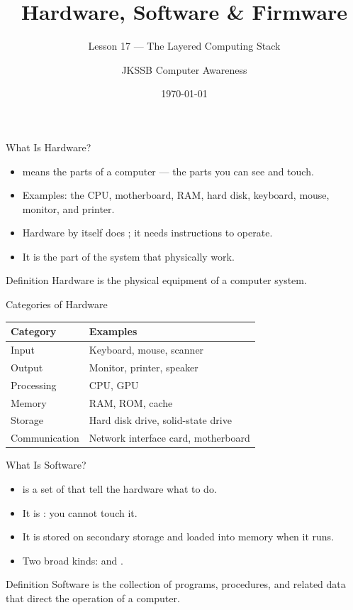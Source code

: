 \documentclass[aspectratio=169]{beamer}
\title{Hardware, Software \& Firmware}
\subtitle{Lesson 17 --- The Layered Computing Stack}
\author{JKSSB Computer Awareness}
\date{\today}
\begin{document}
\frame{\titlepage}

\begin{frame}{What Is Hardware?}
  \begin{itemize}
    \item {} means the  parts of a
      computer --- the parts you can see and touch.
    \item Examples: the CPU, motherboard, RAM, hard disk, keyboard, mouse,
      monitor, and printer.
    \item Hardware by itself does ; it needs
      instructions to operate.
    \item It is the part of the system that physically  work.
  \end{itemize}
  \begin{block}{Definition}
    Hardware is the physical equipment of a computer system.
  \end{block}
\end{frame}

\begin{frame}{Categories of Hardware}
  \begin{center}
    \begin{tabular}{p{}p{}}
      \toprule
      \textbf{Category} & \textbf{Examples} \\
      \midrule
      Input & Keyboard, mouse, scanner \\
      Output & Monitor, printer, speaker \\
      Processing & CPU, GPU \\
      Memory & RAM, ROM, cache \\
      Storage & Hard disk drive, solid-state drive \\
      Communication & Network interface card, motherboard \\
      \bottomrule
    \end{tabular}
  \end{center}
  \vspace{0.2cm}
\end{frame}

\begin{frame}{What Is Software?}
  \begin{itemize}
    \item {} is a set of  that
      tell the hardware what to do.
    \item It is : you cannot touch it.
    \item It is stored on secondary storage and loaded into memory when it
      runs.
    \item Two broad kinds:  and .
  \end{itemize}
  \begin{block}{Definition}
    Software is the collection of programs, procedures, and related data that
    direct the operation of a computer.
  \end{block}
\end{frame}
\end{document}
